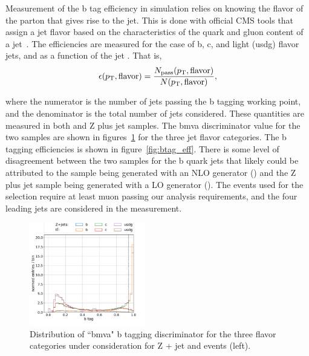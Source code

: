 Measurement of the b tag efficiency in simulation relies on knowing the flavor
of the parton that gives rise to the jet.  This is done with official
CMS tools that assign a jet flavor based on the characteristics of the
quark and gluon content of a jet~\cite{twiki:jet_mc_flavor}.  The
efficiencies are measured for the case of b, c, and light (usdg) flavor
jets, and as a function of the jet \pt.  That is,
\begin{equation}
    \epsilon(p_{\mathrm{T}}, \mathrm{flavor}) = \frac{
        N_{\mathrm{pass}}(p_{\mathrm{T}}, \mathrm{flavor})
        }{
        N(p_{\mathrm{T}}, \mathrm{flavor})
        },
\end{equation}

\noindent where the numerator is the number of jets passing the b tagging working
point, and the denominator is the total number of jets considered.
These quantities are measured in both \ttbar and Z plus jet samples.  The
bmva discriminator value for the two samples are shown in
figures~\ref{fig:btag_bmva} for the three jet flavor categories.  The b
tagging efficiencies is shown in figure~\ref{fig:btag_eff}.  There is
some level of disagreement between the two samples for the b quark jets
that likely could be attributed to the \ttbar sample being generated
with an NLO generator (\POWHEG) and the Z plus jet sample being
generated with a LO generator (\MADGRAPH).  The events used for the
selection require at least muon passing our analysis requirements, and
the four leading \pt jets are considered in the measurement.  

\begin{figure}[h!]
    \centering
    \includegraphics[width=0.45\textwidth]{chapters/Appendix/sectionBtag/figures/bmva_mc.pdf}
    \caption{Distribution of ``bmva" b tagging discriminator for the
    three flavor categories under consideration for Z + jet and
    \ttbar events (left).      
    \label{fig:btag_bmva}}
\end{figure}


